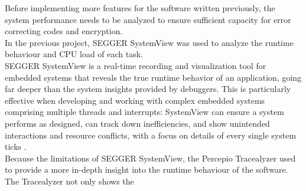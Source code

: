 %
Before implementing more features for the software written previously, the system performance needs to be analyzed to ensure sufficient capacity for error correcting codes and encryption.\\
In the previous project, SEGGER SystemView was used to analyze the runtime behaviour and CPU load of each task.\\
SEGGER SystemView is a real-time recording and visualization tool for embedded systems that reveals the true runtime behavior of an application, going far deeper than the system insights provided by debuggers. This is particularly effective when developing and working with complex embedded systems comprising multiple threads and interrupts: SystemView can ensure a system performs as designed, can track down inefficiencies, and show unintended interactions and resource conflicts, with a focus on details of every single system ticks \cite{SeggerSystemView}.\\
Because the limitations of SEGGER SystemView, the Percepio Tracealyzer used to provide a more in-depth insight into the runtime behaviour of the software. The Tracealyzer not only shows the 